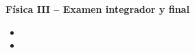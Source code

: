 \documentclass[addpoints]{exam}
\begin{document}
\renewcommand{\tablename}{Tabla}


\begin{tcolorbox}[colback=white,arc=0mm,colframe=black]
    \begin{center}
        \Large\textbf{Física III -- Examen integrador y final}
    \end{center}
\end{tcolorbox}

\begin{itemize}
    \item {}
    \item {}
\end{itemize}
\end{document}
